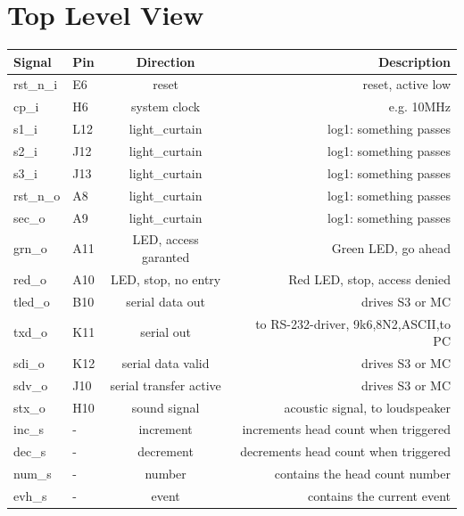 \documentclass[12pt,a4 paper] {report}
\begin{document}
\chapter{Top Level View}
\begin{center}
	\begin{tabular}{|l|l|c|r|}
		\hline
		\textbf{Signal} & \textbf{Pin} & \textbf{Direction} & \textbf{Description} \\
		\hline
		\hline
		rst\_n\_i & E6 & reset & reset, active low \\
		\hline
		cp\_i & H6 & system clock & e.g. 10MHz \\
		\hline
		s1\_i & L12 & light\_curtain & log1: something passes \\
		\hline
		s2\_i & J12 & light\_curtain & log1: something passes \\
		\hline
		s3\_i & J13 & light\_curtain & log1: something passes \\
		\hline
		rst\_n\_o & A8 & light\_curtain & log1: something passes \\
		\hline
		sec\_o & A9 & light\_curtain & log1: something passes \\
		\hline
		grn\_o & A11 & LED, access garanted & Green LED, go ahead \\
		\hline
		red\_o & A10 & LED, stop, no entry & Red LED, stop, access denied \\
		\hline
		tled\_o & B10 & serial data out & drives S3 or MC\\
		\hline
		txd\_o & K11 & serial out & to RS-232-driver, 9k6,8N2,ASCII,to PC\\
		\hline
		sdi\_o & K12 & serial data valid & drives S3 or MC\\
		\hline
		sdv\_o & J10 & serial transfer active & drives S3 or MC\\
		\hline
		stx\_o & H10 & sound signal & acoustic signal, to loudspeaker\\
		\hline
		\hline
		inc\_s & - & increment & increments head count when triggered\\
		\hline
		dec\_s & - & decrement & decrements head count when triggered\\
		\hline
		num\_s & - & number & contains the head count number\\
		\hline
		evh\_s & - & event & contains the current event\\
		\hline
	\end{tabular}
\end{center}
\end{document}
